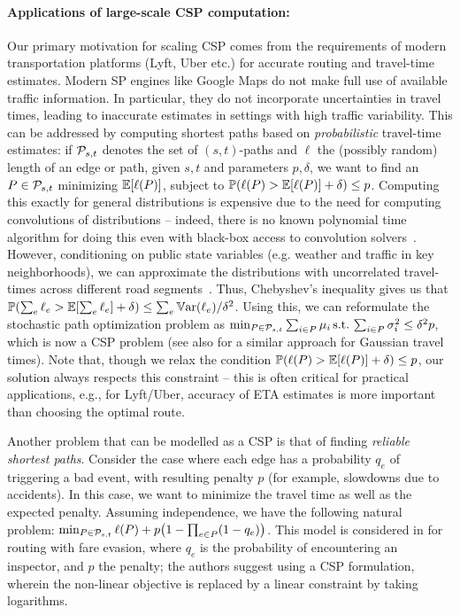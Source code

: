 \documentclass[opre,nonblindrev]{informs3} %
\begin{document}
\paragraph{Applications of large-scale CSP computation:}
Our primary motivation for scaling CSP comes from the requirements of modern transportation platforms (Lyft, Uber etc.) for accurate routing and travel-time estimates.
Modern SP engines like Google Maps do not make full use of available traffic information.
In particular, they do not incorporate uncertainties in travel times, leading to inaccurate estimates in settings with high traffic variability.
This can be addressed by computing shortest paths based on \emph{probabilistic} travel-time estimates:
if $\mathcal{P}_{s,t}$ denotes the set of $(s,t)$-paths and $\ell$ the (possibly random) length of an edge or path, given $s,t$ and parameters $p,\delta$, we want to find an $P\in\mathcal{P}_{s,t}$ minimizing $\mathbb{E}[\ell(P)]$, subject to $\mathbb{P}(\ell(P)>\mathbb{E}[\ell(P)]+\delta)\leq p$.
Computing this exactly for general distributions is expensive due to the need for computing convolutions of distributions -- indeed, there is no known polynomial time algorithm for doing this even with black-box access to convolution solvers~\cite{nikolova_gaussian}. 
However, conditioning on public state variables (e.g. weather and traffic in key neighborhoods),  we can approximate the distributions with uncorrelated travel-times across different road segments~\citep{woodard2017predicting}. 
Thus, Chebyshev's inequality gives us that $\mathbb{P}(\sum_e\ell_e>\mathbb{E}[\sum_e\ell_e]+\delta)\leq \sum_e\mathbb{V}\textnormal{ar}(\ell_e)/\delta^2$. 
Using this, we can reformulate the stochastic path optimization problem as 
$\min_{ P\in\mathcal{P}_{s,t}}\sum_{i\in P}\mu_i \, \mbox{s.t.}\, \sum_{i\in P}\sigma^2_i\leq \delta^2p$, which is now a CSP problem (see also \cite{nikolova_gaussian} for a similar approach for Gaussian travel times). 
Note that, though we relax the condition $\mathbb{P}(\ell(P)>\mathbb{E}[\ell(P)]+\delta)\leq p$, our solution always respects this constraint -- this is often critical for practical applications, e.g., for Lyft/Uber, accuracy of ETA estimates is more important than choosing the optimal route.

Another problem that can be modelled as a CSP is that of finding \emph{reliable shortest paths}.
Consider the case where each edge has a probability $q_e$ of triggering a bad event, with resulting penalty $p$ (for example, slowdowns due to accidents).
In this case, we want to minimize the travel time as well as the expected penalty.
Assuming independence, we have the following natural problem:
$\min_{P\in\Pst} \ell(P)+p\prn*{1-\prod_{e\in P}(1-q_e)}$.
This model is considered in \citep{fareevasion} for routing with fare evasion, where $q_e$ is the probability of encountering an inspector, and $p$ the penalty; the authors suggest using a CSP formulation, wherein the non-linear objective is replaced by a linear constraint by taking logarithms.
\end{document}

